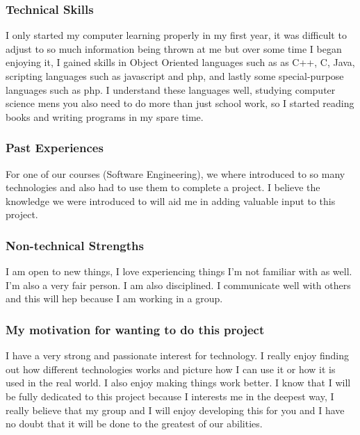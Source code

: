 \documentclass[a4paper,12pt]{article}
\begin{document}
			\subsubsection{Technical Skills}
			I only started my computer learning properly in  my first year, it was difficult to adjust to so much information being thrown at me but over some time I began enjoying it, I gained skills in Object Oriented languages such as  as C++, C, Java, scripting languages such as javascript and php, and lastly some special-purpose languages such as php. I understand these languages well, studying computer science mens you also need to do more than just school work, so I started reading books and writing programs in my spare time.
			
			\subsubsection{Past Experiences}
			For one of our courses (Software Engineering), we where introduced to so many technologies and also had to use them to complete a project. I believe the knowledge we were introduced to will aid me in adding valuable input to this project.
			
			\subsubsection{Non-technical Strengths}
			I am open to new things, I love experiencing things I'm not familiar with as well. I'm also a very fair person. I am also disciplined. I communicate well with others and this will hep because I am working in a group.
			\subsubsection{My motivation for wanting to do this project}
			I have a very strong and passionate interest for technology. I really enjoy finding out how different technologies works and picture how I can use it or  how it is used in the real world. I also enjoy making things work better. I know that I will be fully dedicated to this project because I interests me in the deepest way, I really believe that my group and I will enjoy developing this for you and I have no doubt that it will be done to the greatest of our abilities.  
		
		\newpage
\end{document}
